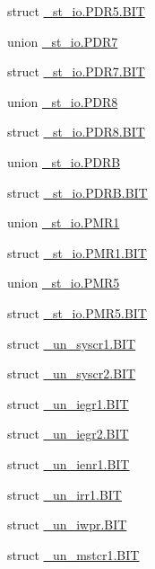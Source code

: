 \begin{DoxyCompactItemize}
\item 
struct \hyperlink{3694s_8h_d0/da1/struct__st__io_8PDR5_8BIT}{\+\_\+st\+\_\+io.\+P\+D\+R5.\+B\+I\+T}
\item 
union \hyperlink{3694s_8h_d3/d1a/union__st__io_8PDR7}{\+\_\+st\+\_\+io.\+P\+D\+R7}
\item 
struct \hyperlink{3694s_8h_d7/dae/struct__st__io_8PDR7_8BIT}{\+\_\+st\+\_\+io.\+P\+D\+R7.\+B\+I\+T}
\item 
union \hyperlink{3694s_8h_db/d69/union__st__io_8PDR8}{\+\_\+st\+\_\+io.\+P\+D\+R8}
\item 
struct \hyperlink{3694s_8h_df/d0e/struct__st__io_8PDR8_8BIT}{\+\_\+st\+\_\+io.\+P\+D\+R8.\+B\+I\+T}
\item 
union \hyperlink{3694s_8h_d3/d6d/union__st__io_8PDRB}{\+\_\+st\+\_\+io.\+P\+D\+R\+B}
\item 
struct \hyperlink{3694s_8h_dd/dcf/struct__st__io_8PDRB_8BIT}{\+\_\+st\+\_\+io.\+P\+D\+R\+B.\+B\+I\+T}
\item 
union \hyperlink{3694s_8h_d9/da2/union__st__io_8PMR1}{\+\_\+st\+\_\+io.\+P\+M\+R1}
\item 
struct \hyperlink{3694s_8h_d1/d2d/struct__st__io_8PMR1_8BIT}{\+\_\+st\+\_\+io.\+P\+M\+R1.\+B\+I\+T}
\item 
union \hyperlink{3694s_8h_d9/deb/union__st__io_8PMR5}{\+\_\+st\+\_\+io.\+P\+M\+R5}
\item 
struct \hyperlink{3694s_8h_d1/d5e/struct__st__io_8PMR5_8BIT}{\+\_\+st\+\_\+io.\+P\+M\+R5.\+B\+I\+T}
\item 
struct \hyperlink{3694s_8h_d1/df7/struct__un__syscr1_8BIT}{\+\_\+un\+\_\+syscr1.\+B\+I\+T}
\item 
struct \hyperlink{3694s_8h_dd/d1f/struct__un__syscr2_8BIT}{\+\_\+un\+\_\+syscr2.\+B\+I\+T}
\item 
struct \hyperlink{3694s_8h_d6/d7c/struct__un__iegr1_8BIT}{\+\_\+un\+\_\+iegr1.\+B\+I\+T}
\item 
struct \hyperlink{3694s_8h_dd/dbb/struct__un__iegr2_8BIT}{\+\_\+un\+\_\+iegr2.\+B\+I\+T}
\item 
struct \hyperlink{3694s_8h_d5/d5e/struct__un__ienr1_8BIT}{\+\_\+un\+\_\+ienr1.\+B\+I\+T}
\item 
struct \hyperlink{3694s_8h_d8/ded/struct__un__irr1_8BIT}{\+\_\+un\+\_\+irr1.\+B\+I\+T}
\item 
struct \hyperlink{3694s_8h_d6/dcd/struct__un__iwpr_8BIT}{\+\_\+un\+\_\+iwpr.\+B\+I\+T}
\item 
struct \hyperlink{3694s_8h_d8/d99/struct__un__mstcr1_8BIT}{\+\_\+un\+\_\+mstcr1.\+B\+I\+T}
\end{DoxyCompactItemize}
